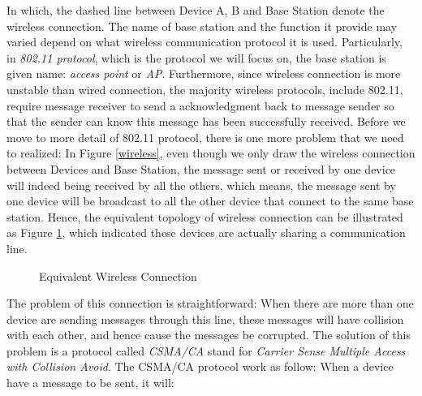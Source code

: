 \documentclass[10pt,a4paper]{article}
\begin{document}
In which, the dashed line between Device A, B and Base Station denote the wireless connection. The name of base station and the function it provide may varied depend on what wireless communication protocol it is used. Particularly, in \textit{802.11 protocol}, which is the protocol we will focus on, the base station is given name: \textit{access point} or \textit{AP}. Furthermore, since wireless connection is more unstable than wired connection, the majority wireless protocols, include 802.11, require message receiver to send a acknowledgment back to message sender so that the sender can know this message has been successfully received. Before we move to more detail of 802.11 protocol, there is one more problem that we need to realized: In Figure \ref{wireless}, even though we only draw the wireless connection between Devices and Base Station, the message sent or received by one device will indeed being received by all the others, which means, the message sent by one device will be broadcast to all the other device that connect to the same base station. Hence, the equivalent topology of wireless connection can be illustrated as Figure \ref{equivalent}, which indicated these devices are actually sharing a communication line.
\begin{figure}[ht]
	\center
	\caption{Equivalent Wireless Connection}
	\label{equivalent}
\end{figure}
The problem of this connection is straightforward: When there are more than one device are sending messages through this line, these messages will have collision with each other, and hence cause the messages be corrupted. The solution of this problem is a protocol called \textit{CSMA/CA} stand for \textit{Carrier Sense Multiple Access with Collision Avoid}. The CSMA/CA protocol work as follow: When a device have a message to be sent, it will:
\end{document}

